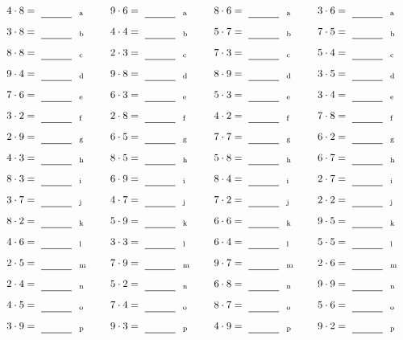 \documentclass
[
  draft    = true,
  fontsize = 11pt,
  parskip  = half-
]
{scrartcl}
\begin{document}
\par\vfill\par
\begin{align*}
    \pline{4\cdot8}&=\rline{a}
  & \pline{9\cdot6}&=\rline{a}
  & \pline{8\cdot6}&=\rline{a}
  & \pline{3\cdot6}&=\rline{a} \\[1ex]
    \pline{3\cdot8}&=\rline{b}
  & \pline{4\cdot4}&=\rline{b}
  & \pline{5\cdot7}&=\rline{b}
  & \pline{7\cdot5}&=\rline{b} \\[1ex]
    \pline{8\cdot8}&=\rline{c}
  & \pline{2\cdot3}&=\rline{c}
  & \pline{7\cdot3}&=\rline{c}
  & \pline{5\cdot4}&=\rline{c} \\[1ex]
    \pline{9\cdot4}&=\rline{d}
  & \pline{9\cdot8}&=\rline{d}
  & \pline{8\cdot9}&=\rline{d}
  & \pline{3\cdot5}&=\rline{d} \\[1ex]
    \pline{7\cdot6}&=\rline{e}
  & \pline{6\cdot3}&=\rline{e}
  & \pline{5\cdot3}&=\rline{e}
  & \pline{3\cdot4}&=\rline{e} \\[1ex]
    \pline{3\cdot2}&=\rline{f}
  & \pline{2\cdot8}&=\rline{f}
  & \pline{4\cdot2}&=\rline{f}
  & \pline{7\cdot8}&=\rline{f} \\[1ex]
    \pline{2\cdot9}&=\rline{g}
  & \pline{6\cdot5}&=\rline{g}
  & \pline{7\cdot7}&=\rline{g}
  & \pline{6\cdot2}&=\rline{g} \\[1ex]
    \pline{4\cdot3}&=\rline{h}
  & \pline{8\cdot5}&=\rline{h}
  & \pline{5\cdot8}&=\rline{h}
  & \pline{6\cdot7}&=\rline{h} \\[1ex]
    \pline{8\cdot3}&=\rline{i}
  & \pline{6\cdot9}&=\rline{i}
  & \pline{8\cdot4}&=\rline{i}
  & \pline{2\cdot7}&=\rline{i} \\[1ex]
    \pline{3\cdot7}&=\rline{j}
  & \pline{4\cdot7}&=\rline{j}
  & \pline{7\cdot2}&=\rline{j}
  & \pline{2\cdot2}&=\rline{j} \\[1ex]
    \pline{8\cdot2}&=\rline{k}
  & \pline{5\cdot9}&=\rline{k}
  & \pline{6\cdot6}&=\rline{k}
  & \pline{9\cdot5}&=\rline{k} \\[1ex]
    \pline{4\cdot6}&=\rline{l}
  & \pline{3\cdot3}&=\rline{l}
  & \pline{6\cdot4}&=\rline{l}
  & \pline{5\cdot5}&=\rline{l} \\[1ex]
    \pline{2\cdot5}&=\rline{m}
  & \pline{7\cdot9}&=\rline{m}
  & \pline{9\cdot7}&=\rline{m}
  & \pline{2\cdot6}&=\rline{m} \\[1ex]
    \pline{2\cdot4}&=\rline{n}
  & \pline{5\cdot2}&=\rline{n}
  & \pline{6\cdot8}&=\rline{n}
  & \pline{9\cdot9}&=\rline{n} \\[1ex]
    \pline{4\cdot5}&=\rline{o}
  & \pline{7\cdot4}&=\rline{o}
  & \pline{8\cdot7}&=\rline{o}
  & \pline{5\cdot6}&=\rline{o} \\[1ex]
    \pline{3\cdot9}&=\rline{p}
  & \pline{9\cdot3}&=\rline{p}
  & \pline{4\cdot9}&=\rline{p}
  & \pline{9\cdot2}&=\rline{p}
\end{align*}
\end{document}
